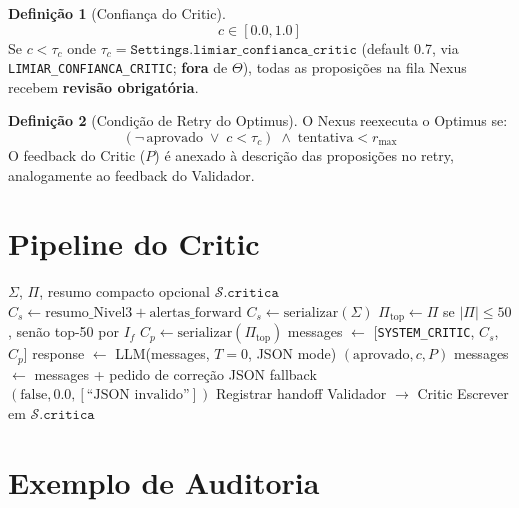 \documentclass[a4paper, 12pt]{report}
\theoremstyle{definition}
\newtheorem{definicao}{Defini\c{c}\~ao}[chapter]
\theoremstyle{remark}
\newcommand{\state}{\mathcal{S}}
\begin{document}
\begin{definicao}[Confian\c{c}a do Critic]
  \[
    c \in [0.0, 1.0]
  \]
  Se $c < \tau_c$ onde $\tau_c =
  \texttt{Settings.limiar\_confianca\_critic}$
  (default 0.7, via \texttt{LIMIAR\_CONFIANCA\_CRITIC}; \textbf{fora}
  de $\Theta$), todas as proposi\c{c}\~oes na fila Nexus recebem
  \textbf{revis\~ao obrigat\'oria}.
\end{definicao}

\begin{definicao}[Condi\c{c}\~ao de Retry do Optimus]
  O Nexus reexecuta o Optimus se:
  \[
    (\neg\,\text{aprovado} \;\lor\; c < \tau_c)
    \;\land\; \text{tentativa} < r_{\max}
  \]
  O feedback do Critic ($P$) \'e anexado \`a descri\c{c}\~ao das
  proposi\c{c}\~oes no retry, analogamente ao feedback do Validador.
\end{definicao}


\section{Pipeline do Critic}

\begin{algorithm}[H]
\caption{Critic -- Auditoria de Coer\^encia}
\begin{algorithmic}[1]
  \Require $\Sigma$, $\Pi$, resumo compacto opcional
  \Ensure $\state.\texttt{critica}$
    \State $C_s \gets \text{resumo\_Nivel3} + \text{alertas\_forward}$
  \Else
    \State $C_s \gets \text{serializar}(\Sigma)$
  \EndIf
  \State $\Pi_{\text{top}} \gets \Pi$ se $|\Pi| \leq 50$, sen\~ao top-50 por $I_f$
  \State $C_p \gets \text{serializar}(\Pi_{\text{top}})$
  \State messages $\gets$ [\texttt{SYSTEM\_CRITIC}, $C_s$, $C_p$]
    \State response $\gets$ LLM(messages, $T=0$, JSON mode)
      \State \Return $(\text{aprovado}, c, P)$
    \EndIf
    \State messages $\gets$ messages + pedido de corre\c{c}\~ao JSON
  \EndFor
  \State \Return fallback $(\text{false}, 0.0, [\text{``JSON invalido''}])$
  \State Registrar handoff Validador $\to$ Critic
  \State Escrever em $\state.\texttt{critica}$
\end{algorithmic}
\end{algorithm}


\section{Exemplo de Auditoria}
\end{document}
